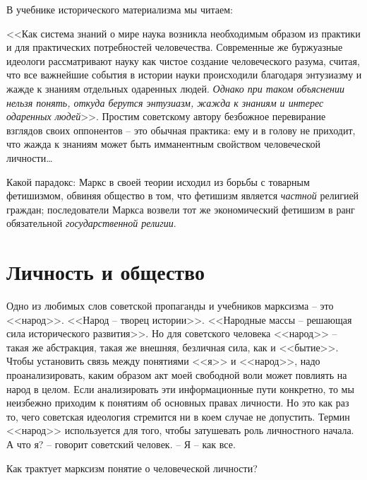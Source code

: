 \documentclass{book}
\begin{document}
В учебнике исторического материализма мы читаем:

<<Как система знаний о мире наука возникла необходимым образом из практики и для практических потребностей человечества. 
Современные же буржуазные идеологи рассматривают науку как чистое создание человеческого разума, считая, что все важнейшие 
события в истории науки происходили благодаря энтузиазму и жажде к знаниям отдельных одаренных людей. \textit{Однако при таком 
объяснении нельзя понять, откуда берутся энтузиазм, жажда к знаниям и интерес одаренных людей}>>.%
Простим советскому автору безбожное перевирание взглядов своих оппонентов -- это обычная практика: ему и в голову не приходит, что жажда к знаниям может быть имманентным свойством человеческой личности\ldots

Какой парадокс: Маркс в своей теории исходил из борьбы с товарным фетишизмом, обвиняя общество в том, что фети­шизм является 
\textit{частной}  религией граждан; последователи Маркса возвели тот же экономический фетишизм в ранг обязательной 
\textit{государственной религии}. 


\section{Личность и общество}

Одно из любимых слов советской пропаганды и учебников марксизма -- это <<народ>>. <<Народ -- творец истории>>. <<Народные массы -- 
решающая сила исторического развития>>. Но для советского человека <<народ>> -- такая же абстракция, такая же внешняя, безличная 
сила, как и <<бытие>>. Чтобы установить связь между понятиями <<я>> и <<народ>>, надо проанализировать, каким образом акт моей 
свободной воли может повлиять на народ в целом. Если анализировать эти информационные пути конкретно, то мы неизбежно приходим к 
понятиям об основных правах личности. Но это как раз то, чего советская идеология стремится ни в коем случае не допустить. 
Термин <<народ>> ис­пользуется для того, чтобы затушевать роль личностного нача­ла. А что я? -- говорит советский человек. -- Я -- 
как все.

Как трактует марксизм понятие о человеческой личности?
\end{document}
